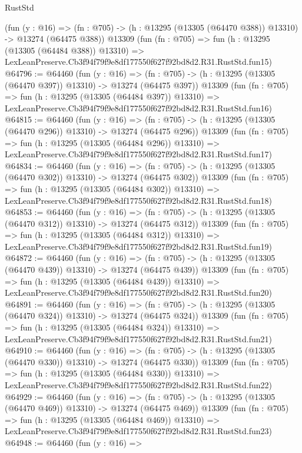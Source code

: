 \begin{lexlean}{RustStd}
\begin{coremodule}
    (fun (y : @16) =>
    (fn : @705) -> (h : @13295 (@13305 (@64470 @388)) @13310) -> @13274 (@64475 @388))
    @13309
    (fun (fn : @705) =>
    fun (h : @13295 (@13305 (@64484 @388)) @13310) =>
    LexLeanPreserve.Cb3f94f79f9e8df177550f627f92bd8d2.R31.RustStd.fun15)
@64796 := @64460
    (fun (y : @16) =>
    (fn : @705) -> (h : @13295 (@13305 (@64470 @397)) @13310) -> @13274 (@64475 @397))
    @13309
    (fun (fn : @705) =>
    fun (h : @13295 (@13305 (@64484 @397)) @13310) =>
    LexLeanPreserve.Cb3f94f79f9e8df177550f627f92bd8d2.R31.RustStd.fun16)
@64815 := @64460
    (fun (y : @16) =>
    (fn : @705) -> (h : @13295 (@13305 (@64470 @296)) @13310) -> @13274 (@64475 @296))
    @13309
    (fun (fn : @705) =>
    fun (h : @13295 (@13305 (@64484 @296)) @13310) =>
    LexLeanPreserve.Cb3f94f79f9e8df177550f627f92bd8d2.R31.RustStd.fun17)
@64834 := @64460
    (fun (y : @16) =>
    (fn : @705) -> (h : @13295 (@13305 (@64470 @302)) @13310) -> @13274 (@64475 @302))
    @13309
    (fun (fn : @705) =>
    fun (h : @13295 (@13305 (@64484 @302)) @13310) =>
    LexLeanPreserve.Cb3f94f79f9e8df177550f627f92bd8d2.R31.RustStd.fun18)
@64853 := @64460
    (fun (y : @16) =>
    (fn : @705) -> (h : @13295 (@13305 (@64470 @312)) @13310) -> @13274 (@64475 @312))
    @13309
    (fun (fn : @705) =>
    fun (h : @13295 (@13305 (@64484 @312)) @13310) =>
    LexLeanPreserve.Cb3f94f79f9e8df177550f627f92bd8d2.R31.RustStd.fun19)
@64872 := @64460
    (fun (y : @16) =>
    (fn : @705) -> (h : @13295 (@13305 (@64470 @439)) @13310) -> @13274 (@64475 @439))
    @13309
    (fun (fn : @705) =>
    fun (h : @13295 (@13305 (@64484 @439)) @13310) =>
    LexLeanPreserve.Cb3f94f79f9e8df177550f627f92bd8d2.R31.RustStd.fun20)
@64891 := @64460
    (fun (y : @16) =>
    (fn : @705) -> (h : @13295 (@13305 (@64470 @324)) @13310) -> @13274 (@64475 @324))
    @13309
    (fun (fn : @705) =>
    fun (h : @13295 (@13305 (@64484 @324)) @13310) =>
    LexLeanPreserve.Cb3f94f79f9e8df177550f627f92bd8d2.R31.RustStd.fun21)
@64910 := @64460
    (fun (y : @16) =>
    (fn : @705) -> (h : @13295 (@13305 (@64470 @330)) @13310) -> @13274 (@64475 @330))
    @13309
    (fun (fn : @705) =>
    fun (h : @13295 (@13305 (@64484 @330)) @13310) =>
    LexLeanPreserve.Cb3f94f79f9e8df177550f627f92bd8d2.R31.RustStd.fun22)
@64929 := @64460
    (fun (y : @16) =>
    (fn : @705) -> (h : @13295 (@13305 (@64470 @469)) @13310) -> @13274 (@64475 @469))
    @13309
    (fun (fn : @705) =>
    fun (h : @13295 (@13305 (@64484 @469)) @13310) =>
    LexLeanPreserve.Cb3f94f79f9e8df177550f627f92bd8d2.R31.RustStd.fun23)
@64948 := @64460
    (fun (y : @16) =>

\end{coremodule}
\end{lexlean}
